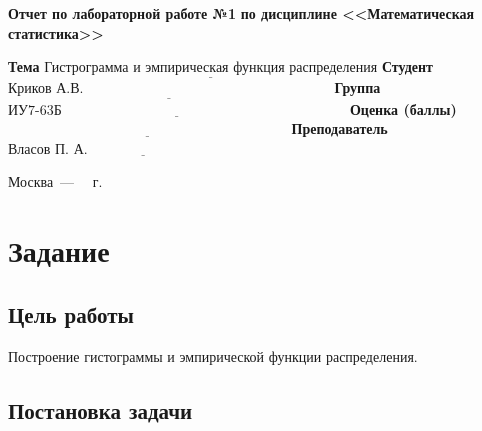 \documentclass[12pt]{report}
\begin{document}
\begin{titlepage}
		\begin{center}
			\noindent\begin{minipage}{1.1\textwidth}\centering
				\Large\textbf{  Отчет по лабораторной работе №1}\newline
				\textbf{по дисциплине <<Математическая статистика>>}\newline\newline\newline
			\end{minipage}
		\end{center}
		
		\noindent\textbf{Тема} $\underline{\text{Гистрограмма и эмпирическая функция распределения}}$\newline\newline
		\noindent\textbf{Студент} $\underline{\text{Криков А.В.~~~~~~~~~~~~~~~~~~~~~~~~~~~~~~~~~~~~~~~~~~~~~~~~~~~~~}}$\newline\newline
		\noindent\textbf{Группа} $\underline{\text{ИУ7-63Б~~~~~~~~~~~~~~~~~~~~~~~~~~~~~~~~~~~~~~~~~~~~~~~~~~~~~~~~~~~~~}}$\newline\newline
		\noindent\textbf{Оценка (баллы)} $\underline{\text{~~~~~~~~~~~~~~~~~~~~~~~~~~~~~~~~~~~~~~~~~~~~~~~~~~~~~~~~~~~~}}$\newline\newline
		\noindent\textbf{Преподаватель} $\underline{\text{Власов П. А.~~~~~~~~~~~~~~~~~~~~~~~~~~~~~~~~~~~~~~~~~}}$\newline\newline\newline
		
		\begin{center}
			\vfill
			Москва~---~\the\year
			~г.
		\end{center}
	\end{titlepage}

\chapter*{Задание}

\section*{Цель работы}
Построение гистограммы и эмпирической функции распределения.

\section*{Постановка задачи}
\end{document}
